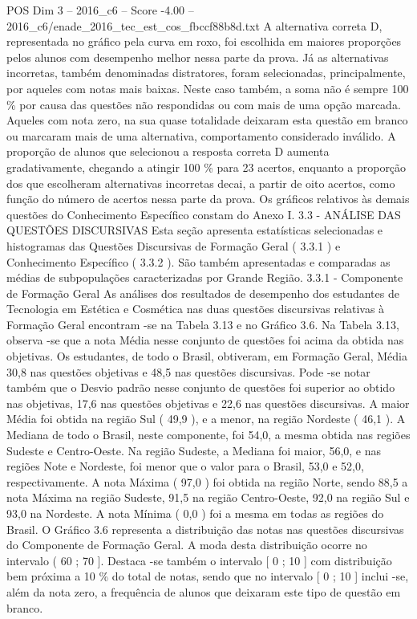 \begin{textsample}{POS Dim 3 – 2016\_c6 – Score -4.00 – 2016\_c6/enade\_2016\_tec\_est\_cos\_fbccf88b8d.txt}
A alternativa correta D, representada no gráfico pela curva em roxo, foi escolhida em maiores proporções pelos alunos com desempenho melhor nessa parte da prova.
Já as alternativas incorretas, também denominadas distratores, foram selecionadas, principalmente, por aqueles com notas mais baixas.
Neste caso também, a soma não é sempre 100 \% por causa das questões não respondidas ou com mais de uma opção marcada.
Aqueles com nota zero, na sua quase totalidade deixaram esta questão em branco ou marcaram mais de uma alternativa, comportamento considerado inválido.
A proporção de alunos que selecionou a resposta correta D aumenta gradativamente, chegando a atingir 100 \% para 23 acertos, enquanto a proporção dos que escolheram alternativas incorretas decai, a partir de oito acertos, como função do número de acertos nessa parte da prova.
Os gráficos relativos às demais questões do Conhecimento Específico constam do Anexo I. 3.3 - ANÁLISE DAS QUESTÕES DISCURSIVAS Esta seção apresenta estatísticas selecionadas e histogramas das Questões Discursivas de Formação Geral ( 3.3.1 ) e Conhecimento Específico ( 3.3.2 ).
São também apresentadas e comparadas as médias de subpopulações caracterizadas por Grande Região. 3.3.1 - Componente de Formação Geral As análises dos resultados de desempenho dos estudantes de Tecnologia em Estética e Cosmética nas duas questões discursivas relativas à Formação Geral encontram -se na Tabela 3.13 e no Gráfico 3.6.
Na Tabela 3.13, observa -se que a nota Média nesse conjunto de questões foi acima da obtida nas objetivas.
Os estudantes, de todo o Brasil, obtiveram, em Formação Geral, Média 30,8 nas questões objetivas e 48,5 nas questões discursivas.
Pode -se notar também que o Desvio padrão nesse conjunto de questões foi superior ao obtido nas objetivas, 17,6 nas questões objetivas e 22,6 nas questões discursivas.
A maior Média foi obtida na região Sul ( 49,9 ), e a menor, na região Nordeste ( 46,1 ).
A Mediana de todo o Brasil, neste componente, foi 54,0, a mesma obtida nas regiões Sudeste e Centro-Oeste.
Na região Sudeste, a Mediana foi maior, 56,0, e nas regiões Note e Nordeste, foi menor que o valor para o Brasil, 53,0 e 52,0, respectivamente.
A nota Máxima ( 97,0 ) foi obtida na região Norte, sendo 88,5 a nota Máxima na região Sudeste, 91,5 na região Centro-Oeste, 92,0 na região Sul e 93,0 na Nordeste.
A nota Mínima ( 0,0 ) foi a mesma em todas as regiões do Brasil.
O Gráfico 3.6 representa a distribuição das notas nas questões discursivas do Componente de Formação Geral.
A moda desta distribuição ocorre no intervalo ( 60 ; 70 ].
Destaca -se também o intervalo [ 0 ; 10 ] com distribuição bem próxima a 10 \% do total de notas, sendo que no intervalo [ 0 ; 10 ] inclui -se, além da nota zero, a frequência de alunos que deixaram este tipo de questão em branco.

\end{textsample}
